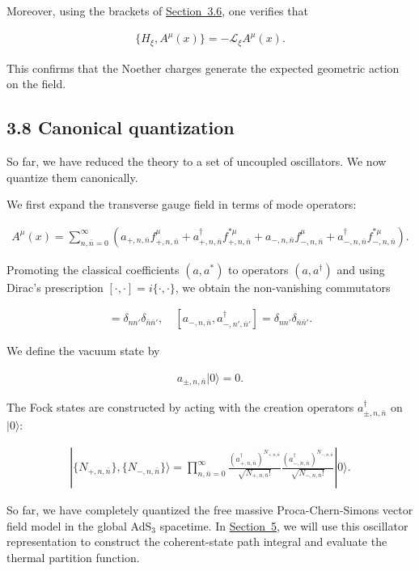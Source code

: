 Moreover, using the brackets of \hyperref[subsec:discrete-hamiltonian-system]{Section~3.6}, one verifies that

\begin{align}
\{H_{\xi}, A^\mu(x)\} = - \mathcal{L}_{\xi} A^\mu(x).
\end{align}

This confirms that the Noether charges generate the expected geometric action on the field.

\subsection{3.8 Canonical quantization}\label{subsec:canonical-quantization}

So far, we have reduced the theory to a set of uncoupled oscillators. We now quantize them canonically.

We first expand the transverse gauge field in terms of mode operators:

\begin{align}
A^{\mu}(x) = \sum_{n,\bar{n}=0}^{\infty} \left( a_{+,n,\bar{n}} f^{\mu}_{+,n,\bar{n}} + a^{\dagger}_{+,n,\bar{n}} f^{*\mu}_{+,n,\bar{n}} + a_{-,n,\bar{n}} f^{\mu}_{-,n,\bar{n}} + a^{\dagger}_{-,n,\bar{n}} f^{*\mu}_{-,n,\bar{n}} \right).
\end{align}

Promoting the classical coefficients $(a,a^*)$ to operators $(a,a^\dagger)$ and using Dirac's prescription $[\cdot,\cdot]=i\{\cdot,\cdot\}$, we obtain the non-vanishing commutators

\begin{align}
[ a_{+,n,\bar{n}}, a^{\dagger}_{+,n',\bar{n}'} ] = \delta_{n n'} \delta_{\bar{n} \bar{n}'}, \quad [ a_{-,n,\bar{n}}, a^{\dagger}_{-,n',\bar{n}'} ] = \delta_{n n'} \delta_{\bar{n} \bar{n}'}.
\end{align}

We define the vacuum state by

\begin{align}
a_{\pm,n,\bar{n}} |0\rangle = 0.
\end{align}

The Fock states are constructed by acting with the creation operators $a^{\dagger}_{\pm,n,\bar{n}}$ on $|0\rangle$:

\begin{align}
|\{N_{+,n,\bar{n}}\}, \{N_{-,n,\bar{n}}\}\rangle = \prod_{n,\bar{n}=0}^{\infty} \frac{(a^{\dagger}_{+,n,\bar{n}})^{N_{+,n,\bar{n}}}}{\sqrt{N_{+,n,\bar{n}}!}} \frac{(a^{\dagger}_{-,n,\bar{n}})^{N_{-,n,\bar{n}}}}{\sqrt{N_{-,n,\bar{n}}!}} |0\rangle.
\end{align}

So far, we have completely quantized the free massive Proca-Chern-Simons vector field model in the global AdS$_3$ spacetime. In \hyperref[sec:thermal-partition-function]{Section~5}, we will use this oscillator representation to construct the coherent-state path integral and evaluate the thermal partition function.
